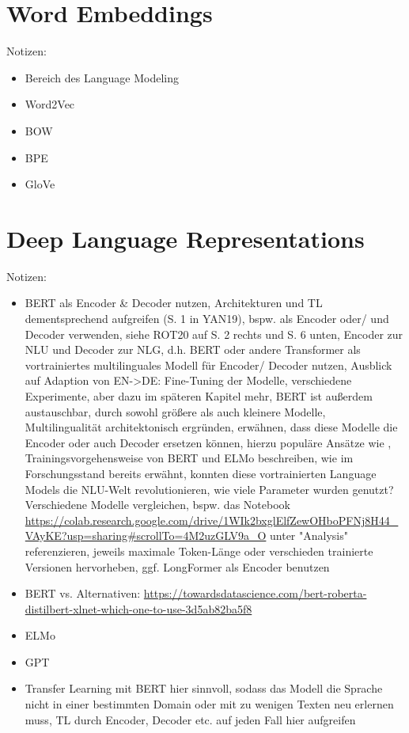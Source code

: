 \section{Word Embeddings}
Notizen:
\begin{itemize}
	\item Bereich des Language Modeling
	\item Word2Vec
	\item BOW
	\item BPE
	\item GloVe
\end{itemize}


\section{Deep Language Representations}
Notizen:
\begin{itemize}
	\item BERT als Encoder \& Decoder nutzen, Architekturen und TL dementsprechend aufgreifen (S. 1 in YAN19), bspw. als Encoder oder/ und Decoder verwenden, siehe ROT20 auf S. 2 rechts und S. 6 unten, Encoder zur NLU und Decoder zur NLG, d.h. BERT oder andere Transformer als vortrainiertes multilinguales Modell für Encoder/ Decoder nutzen, Ausblick auf Adaption von EN->DE: Fine-Tuning der Modelle, verschiedene Experimente, aber dazu im späteren Kapitel mehr, BERT ist außerdem austauschbar, durch sowohl größere als auch kleinere Modelle, Multilingualität architektonisch ergründen, erwähnen, dass diese Modelle die Encoder oder auch Decoder ersetzen können, hierzu populäre Ansätze wie \cite{ROT20}, Trainingsvorgehensweise von BERT und ELMo beschreiben, wie im Forschungsstand bereits erwähnt, konnten diese vortrainierten Language Models die NLU-Welt revolutionieren, wie viele Parameter wurden genutzt? Verschiedene Modelle vergleichen, bspw. das Notebook \url{https://colab.research.google.com/drive/1WIk2bxglElfZewOHboPFNj8H44_VAyKE?usp=sharing#scrollTo=4M2uzGLV9a_O} unter "Analysis" referenzieren, jeweils maximale Token-Länge oder verschieden trainierte Versionen hervorheben, ggf. LongFormer als Encoder benutzen
	\item BERT vs. Alternativen: \url{https://towardsdatascience.com/bert-roberta-distilbert-xlnet-which-one-to-use-3d5ab82ba5f8}
	\item ELMo
	\item GPT
	\item Transfer Learning mit BERT hier sinnvoll, sodass das Modell die Sprache nicht in einer bestimmten Domain oder mit zu wenigen Texten neu erlernen muss, TL durch Encoder, Decoder etc. auf jeden Fall hier aufgreifen

\end{itemize}
